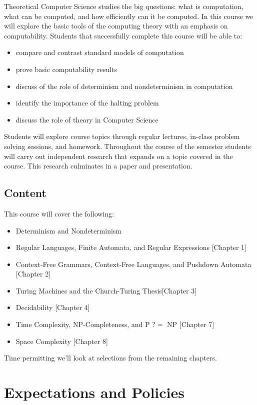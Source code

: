 \documentclass[10pt]{article}
\begin{document}
Theoretical Computer Science studies the big questions: what is computation, what can be computed, and how efficiently can it be computed.  In this course we will explore the basic tools of the computing theory with an emphasis on computability. Students that successfully complete this course will be able to:
\begin{itemize}
\item compare and contrast standard models of computation
\item prove basic computability results
\item discuss of the role of determinism and nondeterminism in computation
\item identify the importance of the halting problem
\item discuss the role of theory in Computer Science
\end{itemize}
Students will explore course topics through regular lectures, in-class problem solving sessions, and homework.  Throughout the course of the semester students will carry out independent research that expands on a topic covered in the course.  This research culminates in a paper and presentation.


\subsection{Content}

This course will cover the following:
\begin{itemize}
\item Determinism and Nondeterminism
\item Regular Languages, Finite Automata, and Regular Expressions [Chapter 1]
\item Context-Free Grammars, Context-Free Languages, and Pushdown Automata [Chapter 2]
\item Turing Machines and the Church-Turing Thesis[Chapter 3]
\item Decidability [Chapter 4]
\item Time Complexity, NP-Completeness, and P $?=$ NP [Chapter 7]
\item Space Complexity [Chapter 8]
\end{itemize}
Time permitting we'll look at selections from the remaining chapters.

\section{Expectations and Policies}
\end{document}
